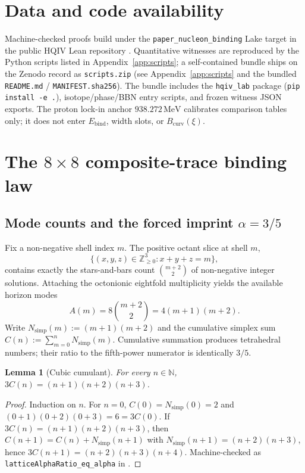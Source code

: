 \documentclass[11pt,notitlepage]{amsart}
\newtheorem{lemma}[theorem]{Lemma}
\begin{document}
\section*{Data and code availability}
\label{sec:data-availability}

Machine-checked proofs build under the \texttt{paper\_nucleon\_binding} Lake target in the
public HQIV Lean repository \cite{hqiv-lean}.
Quantitative witnesses are reproduced by the Python scripts listed in
Appendix~\ref{app:scripts}; a self-contained bundle ships on the Zenodo record as
\texttt{scripts.zip} (see Appendix~\ref{app:scripts} and the bundled
\texttt{README.md} / \texttt{MANIFEST.sha256}).
The bundle includes the \texttt{hqiv\_lab} package (\texttt{pip install -e .}),
isotope/phase/BBN entry scripts, and frozen witness JSON exports.
The proton lock-in anchor $938.272\,\mathrm{MeV}$ calibrates comparison tables only;
it does not enter $E_{\mathrm{bind}}$, width slots, or $B_{\mathrm{curv}}(\xi)$.

\section{The $8\times 8$ composite-trace binding law}
\label{sec:binding}

\subsection{Mode counts and the forced imprint $\alpha=3/5$}
\label{sec:mode-counts}

Fix a non-negative shell index $m$. The positive octant slice at shell $m$,
\[
  \{(x,y,z)\in\mathbb{Z}_{\ge 0}^3 : x+y+z=m\},
\]
contains exactly the stars-and-bars count $\binom{m+2}{2}$ of non-negative integer
solutions. Attaching the octonionic eightfold multiplicity yields the available horizon
modes
\begin{equation}\label{eq:Am}
  A(m)=8\binom{m+2}{2}=4(m+1)(m+2).
\end{equation}
Write $N_{\mathrm{simp}}(m):=(m+1)(m+2)$ and the cumulative simplex sum
$C(n):=\sum_{m=0}^{n}N_{\mathrm{simp}}(m)$. Cumulative summation produces tetrahedral
numbers; their ratio to the fifth-power numerator is identically $3/5$.

\begin{lemma}[Cubic cumulant]\label{lem:hockey}
For every $n\in\mathbb{N}$, $3C(n)=(n+1)(n+2)(n+3)$.
\end{lemma}

\begin{proof}
Induction on $n$. For $n=0$, $C(0)=N_{\mathrm{simp}}(0)=2$ and
$(0+1)(0+2)(0+3)=6=3C(0)$. If $3C(n)=(n+1)(n+2)(n+3)$, then
$C(n+1)=C(n)+N_{\mathrm{simp}}(n+1)$ with $N_{\mathrm{simp}}(n+1)=(n+2)(n+3)$, hence
$3C(n+1)=(n+2)(n+3)(n+4)$. Machine-checked as
\texttt{latticeAlphaRatio\_eq\_alpha} in \cite{hqiv-kirchhoff-paper,hqiv-lightcone-paper}.
\end{proof}
\end{document}
